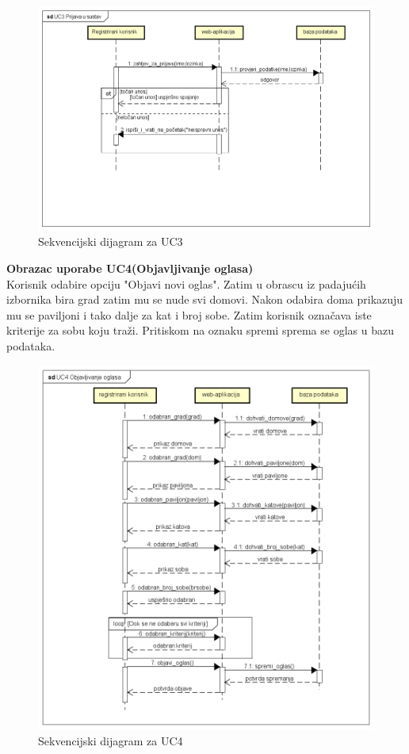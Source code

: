 \begin{figure}[H]
	\includegraphics[scale=0.4]{dijagrami/UC3 Prijava u sustav.PNG} %
	\centering
	\caption{Sekvencijski dijagram za UC3}
	\label{fig:sekdijag1}
\end{figure}

\noindent \textbf{Obrazac uporabe UC4(Objavljivanje oglasa)}\\
\indent Korisnik odabire opciju "Objavi novi oglas". Zatim u obrascu iz padajućih izbornika bira grad zatim mu se nude svi domovi. Nakon odabira doma prikazuju mu se paviljoni i tako dalje za kat i broj sobe. Zatim korisnik označava iste  kriterije za sobu koju traži. Pritiskom na oznaku spremi sprema se oglas u bazu podataka.



\begin{figure}[H]
	\includegraphics[scale=0.4]{dijagrami/UC4 Objavljivanje oglasa.PNG} %
	\centering
	\caption{Sekvencijski dijagram za UC4}
	\label{fig:sekdijag2}
\end{figure}

